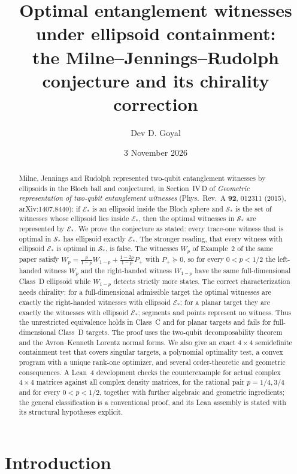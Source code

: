 \documentclass[11pt,a4paper]{article}
\title{Optimal entanglement witnesses under ellipsoid containment:\\[2pt] the Milne--Jennings--Rudolph conjecture and its chirality correction}
\author{Dev D. Goyal}
\date{3 November 2026}
\theoremstyle{definition}\newtheorem{definition}[theorem]{Definition}
\newcommand{\E}{\mathcal E}
\newcommand{\Sstar}{\mathcal S_*}
\theoremstyle{plain}\newtheorem*{theorem*}{Theorem}
\begin{document}
\maketitle
\begin{abstract}
Milne, Jennings and Rudolph represented two-qubit entanglement witnesses by ellipsoids in the Bloch ball and conjectured, in Section~IV\,D of \emph{Geometric representation of two-qubit entanglement witnesses} (Phys.\ Rev.\ A \textbf{92}, 012311 (2015), arXiv:1407.8440): if $\E_*$ is an ellipsoid inside the Bloch sphere and $\Sstar$ is the set of witnesses whose ellipsoid lies inside $\E_*$, then the optimal witnesses in $\Sstar$ are represented by $\E_*$. We prove the conjecture as stated: every trace-one witness that is optimal in $\Sstar$ has ellipsoid exactly $\E_*$. The stronger reading, that every witness with ellipsoid $\E_*$ is optimal in $\Sstar$, is false. The witnesses $W_p$ of Example~2 of the same paper satisfy $W_p=\frac{p}{1-p}W_{1-p}+\frac{1-2p}{1-p}P_+$ with $P_+\succeq0$, so for every $0<p<1/2$ the left-handed witness $W_p$ and the right-handed witness $W_{1-p}$ have the same full-dimensional Class~D ellipsoid while $W_{1-p}$ detects strictly more states. The correct characterization needs chirality: for a full-dimensional admissible target the optimal witnesses are exactly the right-handed witnesses with ellipsoid $\E_*$; for a planar target they are exactly the witnesses with ellipsoid $\E_*$; segments and points represent no witness. Thus the unrestricted equivalence holds in Class~C and for planar targets and fails for full-dimensional Class~D targets. The proof uses the two-qubit decomposability theorem and the Avron--Kenneth Lorentz normal forms. We also give an exact $4\times4$ semidefinite containment test that covers singular targets, a polynomial optimality test, a convex program with a unique rank-one optimizer, and several order-theoretic and geometric consequences. A Lean~4 development checks the counterexample for actual complex $4\times4$ matrices against all complex density matrices, for the rational pair $p=1/4,3/4$ and for every $0<p<1/2$, together with further algebraic and geometric ingredients; the general classification is a conventional proof, and its Lean assembly is stated with its structural hypotheses explicit.
\end{abstract}
\clearpage
\setcounter{tocdepth}{1}
\begingroup
\small
\setlength{\parskip}{0pt}
\tableofcontents
\endgroup
\clearpage

\section{Introduction}
\end{document}
